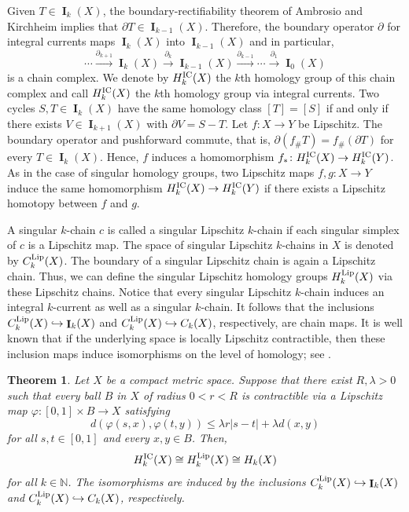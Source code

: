 \documentclass{amsart}
\newtheorem{theorem}{Theorem}[section]
\numberwithin{equation}{section}
\newcommand{\N}{\mathbb{N}}
\DeclareMathOperator{\bI}{\mathbf{I}}
\begin{document}
        Given $T\in \bI_k(X)$, the boundary-rectifiability theorem of Ambrosio and Kirchheim \cite[Theorem 8.6]{ambrosio-kirchheim-2000} implies that $\partial T\in \bI_{k-1}(X)$. Therefore, the boundary operator $\partial$ for integral currents maps $\bI_{k}(X)$ into $\bI_{k-1}(X)$ and in particular, 
        $$
        \dotsm \overset{\partial_{k+1}}{\longrightarrow} \bI_k(X) \overset{\partial_{k}}{\longrightarrow} \bI_{k-1}(X) \overset{\partial_{k-1}}{\longrightarrow} \dotsm \overset{\partial_1}{\longrightarrow} \bI_0(X) 
        $$
        is a chain complex. We denote by $H_k^\textup{IC}(X)$ the $k$th homology group of this chain complex and call $H_k^\textup{IC}(X)$ the $k$th homology group via integral currents. Two cycles $S,T \in \bI_{k}(X)$ have the same homology class $[T] = [S]$ if and only if there exists $V\in \bI_{k+1}(X)$ with $\partial V = S-T$. Let $f\colon X \to Y$ be Lipschitz. The boundary operator and pushforward commute, that is, $\partial (f_\# T) = f_\# (\partial T)$ for every $T\in \bI_k(X)$. Hence, $f$ induces a homomorphism $f_*\colon H_k^\textup{IC}(X) \to H_k^\textup{IC}(Y)$. As in the case of singular homology groups, two Lipschitz maps $f,g\colon X \to Y$ induce the same homomorphism $H_k^\textup{IC}(X) \to H_k^\textup{IC}(Y)$ if there exists a Lipschitz homotopy between $f$ and $g$.
        
        
        \medskip
        
        A singular $k$-chain $c$ is called a singular Lipschitz $k$-chain if each singular simplex of $c$ is a Lipschitz map. The space of singular Lipschitz $k$-chains in $X$ is denoted by $C_k^\textup{Lip}(X)$. The boundary of a singular Lipschitz chain is again a Lipschitz chain. Thus, we can define the singular Lipschitz homology groups $H_k^\textup{Lip}(X)$ via these Lipschitz chains. Notice that every singular Lipschitz $k$-chain induces an integral $k$-current as well as a singular $k$-chain. It follows that the inclusions $C_k^\textup{Lip}(X)\hookrightarrow \bI_k(X)$ and $C_k^\textup{Lip}(X)\hookrightarrow C_k(X)$, respectively, are chain maps. It is well known that if the underlying space is locally Lipschitz contractible, then these inclusion maps induce isomorphisms on the level of homology; see \cite{Mitsuishi,riedweg2009singular}.

        \begin{theorem}\label{thme: sing-integral-homology-coincide}
            Let $X$ be a compact metric space. Suppose that there exist $R, \lambda>0$ such that every ball $B$ in $X$ of radius $0<r<R$ is contractible via a Lipschitz map $\varphi\colon [0,1] \times B\to X$ satisfying
                $$d(\varphi(s,x),\varphi(t,y)) \leq \lambda r |s-t| + \lambda d(x,y)$$
            for all $s,t \in [0,1]$ and every $x,y\in B$. Then, 
            $$H_k^\textup{IC}(X) \cong H_k^\textup{Lip}(X) \cong H_k(X)$$
            for all $k \in \N$. The isomorphisms are induced by the inclusions $C_k^\textup{Lip}(X)\hookrightarrow \bI_k(X)$ and $C_k^\textup{Lip}(X)\hookrightarrow C_k(X)$, respectively.
        \end{theorem}
\end{document}
